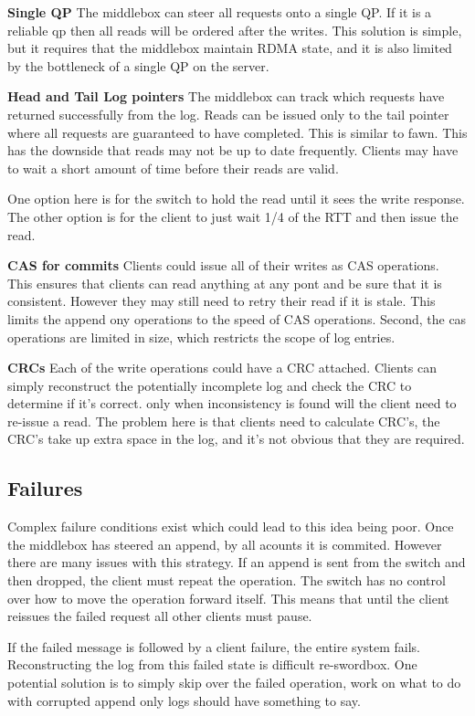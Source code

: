 \textbf{Single QP} The middlebox can steer all requests onto
a single QP. If it is a reliable qp then all reads will be
ordered after the writes. This solution is simple, but it
requires that the middlebox maintain RDMA state, and it is
also limited by the bottleneck of a single QP on the server.

\textbf{Head and Tail Log pointers} The middlebox can track
which requests have returned successfully from the log.
Reads can be issued only to the tail pointer where all
requests are guaranteed to have completed. This is similar
to fawn. This has the downside that reads may not be up to
date frequently. Clients may have to wait a short amount of
time before their reads are valid. 

One option here is for the switch to hold the read until it
sees the write response. The other option is for the client
to just wait 1/4 of the RTT and then issue the read.

\textbf{CAS for commits} Clients could issue all of their
writes as CAS operations. This ensures that clients can read
anything at any pont and be sure that it is consistent.
However they may still need to retry their read if it is
stale. This limits the append ony operations to the speed of
CAS operations. Second, the cas operations are limited in size, which restricts the scope of log entries.

\textbf{CRCs} Each of the write operations could have a CRC
attached. Clients can simply reconstruct the potentially
incomplete log and check the CRC to determine if it's
correct. only when inconsistency is found will the client
need to re-issue a read. The problem here is that clients
need to calculate CRC's, the CRC's take up extra space in
the log, and it's not obvious that they are required.

\subsection{Failures}

Complex failure conditions exist which could lead to this
idea being poor. Once the middlebox has steered an append,
by all acounts it is commited. However there are many issues
with this strategy. If an append is sent from the switch and
then dropped, the client must repeat the operation. The
switch has no control over how to move the operation forward
itself. This means that until the client reissues the failed
request all other clients must pause.

If the failed message is followed by a client failure, the
entire system fails. Reconstructing the log from this failed
state is difficult re-swordbox. One potential solution is to
simply skip over the failed operation, work on what to do
with corrupted append only logs should have something to
say.

